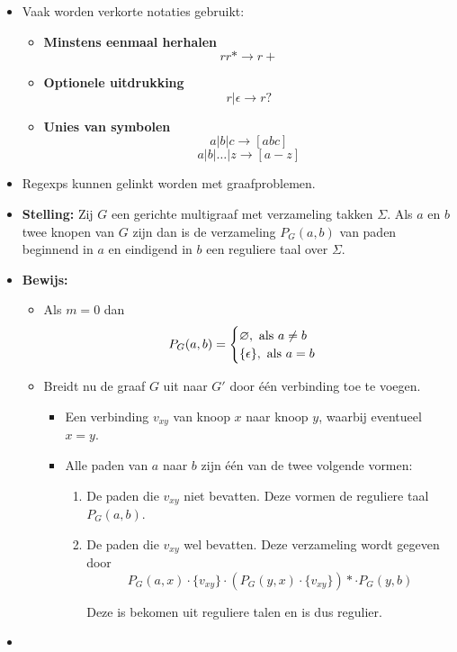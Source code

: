 \begin{itemize}
\begin{table}[ht]
    \end{table}
    \item Vaak worden verkorte notaties gebruikt:
    \begin{itemize}
        \item \textbf{Minstens eenmaal herhalen}
        $$rr* \rightarrow r+$$
        \item \textbf{Optionele uitdrukking}
        $$r|\epsilon \rightarrow r?$$
        
        \item \textbf{Unies van symbolen}
        $$a|b|c \rightarrow [abc] $$
        $$a|b|\dots|z \rightarrow [a-z] $$

        
    \end{itemize}

    \item Regexps kunnen gelinkt worden met graafproblemen.
    \item \textbf{Stelling:} Zij $G$ een gerichte multigraaf met verzameling takken $\Sigma$. Als $a$ en $b$ twee knopen van $G$ zijn dan is de verzameling $P_G(a, b)$ van paden beginnend in $a$ en eindigend in $b$ een reguliere taal over $\Sigma$.
    \item \textbf{Bewijs:}
    \begin{itemize}
        Via inductie op het aantal verbindingen $m$ van $G$.
        \item Als $m = 0$ dan
        $$P_G(a, b) = \begin{cases}
            \varnothing, \hbox{ als } a \neq b\\
            \{\epsilon\}, \hbox{ als } a = b 
        \end{cases}$$
        \item Breidt nu de graaf $G$ uit naar $G'$ door één verbinding toe te voegen.
        \begin{itemize}
            \item Een verbinding $v_{xy}$ van knoop $x$ naar knoop $y$, waarbij eventueel $x = y$.
            \item Alle paden van $a$ naar $b$ zijn één van de twee volgende vormen:
            \begin{enumerate}
                \item De paden die $v_{xy}$ niet bevatten. Deze vormen de reguliere taal $P_G(a, b)$.
                \item De paden die $v_{xy}$ wel bevatten. Deze verzameling wordt gegeven door
                $$P_G(a, x) \cdot \{v_{xy}\} \cdot (P_G(y, x) \cdot \{v_{xy}\})* \cdot P_G(y, b)$$

                Deze is bekomen uit reguliere talen en is dus regulier.
            \end{enumerate}
        \end{itemize}
    \end{itemize}
    \item 
\end{itemize}




